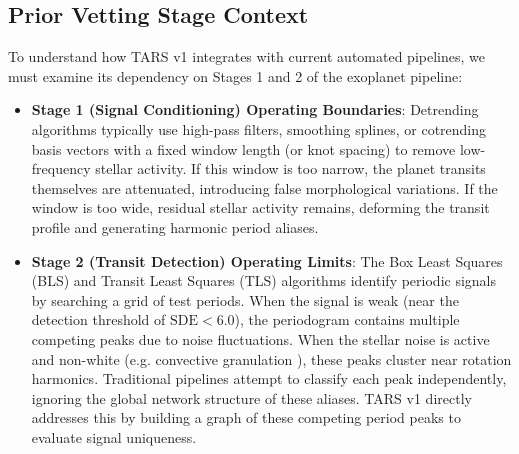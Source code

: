 \subsection{Prior Vetting Stage Context} \label{sec:prior_stages}
To understand how TARS v1 integrates with current automated pipelines, we must examine its dependency on Stages 1 and 2 of the exoplanet pipeline:
\begin{itemize}
\item \textbf{Stage 1 (Signal Conditioning) Operating Boundaries}: Detrending algorithms typically use high-pass filters, smoothing splines, or cotrending basis vectors \citep{Smith2012, Stumpe2012, Vanderburg2014, Luger2016, Luger2018, Aigrain2016} with a fixed window length (or knot spacing) to remove low-frequency stellar activity. If this window is too narrow, the planet transits themselves are attenuated, introducing false morphological variations. If the window is too wide, residual stellar activity remains, deforming the transit profile and generating harmonic period aliases.
\item \textbf{Stage 2 (Transit Detection) Operating Limits}: The Box Least Squares (BLS) \citep{Kovacs2002} and Transit Least Squares (TLS) \citep{Hippke2019} algorithms identify periodic signals by searching a grid of test periods. When the signal is weak (near the detection threshold of $\text{SDE} < 6.0$), the periodogram \citep{Deeming1975, Roberts1987, Lomb1976, Scargle1982, VanderPlas2018} contains multiple competing peaks due to noise fluctuations. When the stellar noise is active and non-white (e.g. convective granulation \citealt{Meunier2010}), these peaks cluster near rotation harmonics. Traditional pipelines attempt to classify each peak independently, ignoring the global network structure of these aliases. TARS v1 directly addresses this by building a graph of these competing period peaks to evaluate signal uniqueness.
\end{itemize}
